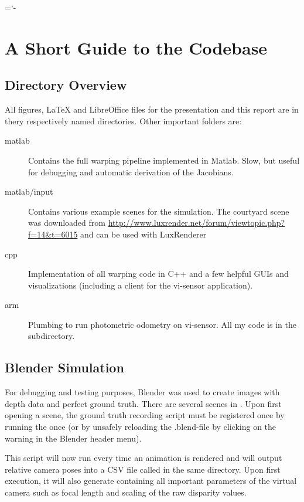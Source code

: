 \hyphenchar\font=`-


\chapter{A Short Guide to the Codebase}
\label{sec:usage}

\section{Directory Overview}

All figures, LaTeX and LibreOffice files for the presentation and this report
are in thery respectively named directories. Other important folders are:

\begin{description}
    \item[matlab]
        Contains the full warping pipeline implemented in Matlab. Slow, but useful for debugging and automatic derivation of the Jacobians.
    \item[matlab/input]
        Contains various example scenes for the simulation.
        The courtyard scene was downloaded from \url{http://www.luxrender.net/forum/viewtopic.php?f=14\&t=6015} and can be used with LuxRenderer
    \item[cpp] Implementation of all warping code in C++ and a few helpful GUIs and visualizations (including a client for the vi-sensor application).
    \item[arm] Plumbing to run photometric odometry on vi-sensor. All my code is in the  subdirectory.
\end{description}


\section{Blender Simulation}

For debugging and testing purposes, Blender was used to create images with
depth data and perfect ground truth.  There are several scenes in
. Upon first opening a scene, the ground truth
recording script must be registered once by running the
 once (or by unsafely reloading the .blend-file by
clicking on the warning in the Blender header menu).

This script will now run every time an animation is rendered and will output
relative camera poses into a CSV file called
 in the same directory. Upon first
execution, it will also generate  containing all
important parameters of the virtual camera such as focal length and scaling of
the raw disparity values.

